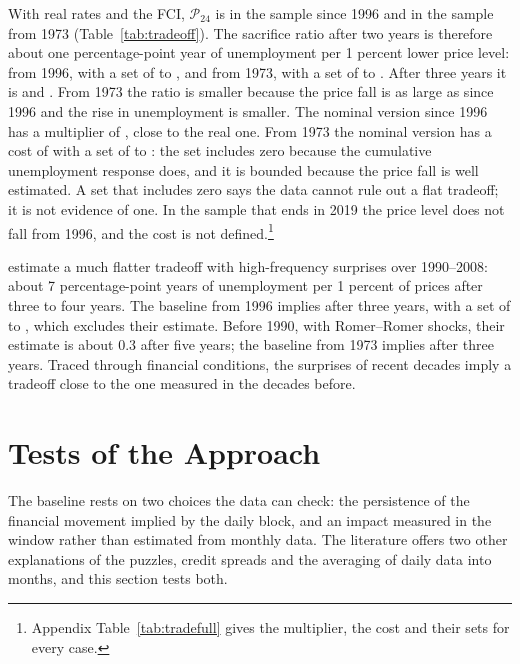 \documentclass[11pt]{article}
\begin{document}


With real rates and the FCI, $\mathcal{P}_{24}$ is  in the sample since 1996 and  in the sample from 1973 (Table~\ref{tab:tradeoff}). The sacrifice ratio after two years is therefore about one percentage-point year of unemployment per 1 percent lower price level:  from 1996, with a set of  to , and  from 1973, with a set of  to . After three years it is  and . From 1973 the ratio is smaller because the price fall is as large as since 1996 and the rise in unemployment is smaller. The nominal version since 1996 has a multiplier of , close to the real one. From 1973 the nominal version has a cost of  with a set of  to : the set includes zero because the cumulative unemployment response does, and it is bounded because the price fall is well estimated. A set that includes zero says the data cannot rule out a flat tradeoff; it is not evidence of one. In the sample that ends in 2019 the price level does not fall from 1996, and the cost is not defined.\footnote{Appendix Table~\ref{tab:tradefull} gives the multiplier, the cost and their sets for every case.}

\citet{barnichon2021} estimate a much flatter tradeoff with high-frequency surprises over 1990--2008: about 7 percentage-point years of unemployment per 1 percent of prices after three to four years. The baseline from 1996 implies  after three years, with a set of  to , which excludes their estimate. Before 1990, with Romer--Romer shocks, their estimate is about 0.3 after five years; the baseline from 1973 implies  after three years. Traced through financial conditions, the surprises of recent decades imply a tradeoff close to the one measured in the decades before.

\FloatBarrier
\section{Tests of the Approach}\label{sec:tests}
The baseline rests on two choices the data can check: the persistence of the financial movement implied by the daily block, and an impact measured in the window rather than estimated from monthly data. The literature offers two other explanations of the puzzles, credit spreads and the averaging of daily data into months, and this section tests both.
\end{document}
